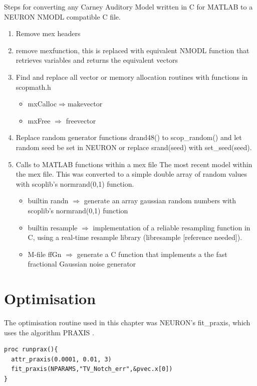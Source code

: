 Steps for converting any Carney Auditory Model written in C for MATLAB to a
NEURON NMODL compatible C file.
\begin{enumerate} 
\item Remove mex headers 
\item remove \textsf{mexfunction}, this is replaced with equivalent NMODL
  function that retrieves variables and returns the equivalent vectors
\item Find and replace all vector or memory allocation routines with functions
  in scopmath.h
\begin{itemize} 
\item \textsf{mxCalloc}$\Rightarrow$\textsf{makevector}
\item \textsf{mxFree} $\Rightarrow$ \textsf{freevector}
\end{itemize} 
\item Replace random generator functions \textsf{drand48()} to
  \mbox{\textsf{scop\_random()}} and let random seed be set in NEURON or replace
  \textsf{srand(seed)} with \mbox{\textsf{set\_seed(seed)}}.
\item Calls to MATLAB functions within a mex file The most recent model within
  the mex file.  This was converted to a simple double array of random values
  with scoplib's \mbox{\textsf{normrand(0,1)}} function.
\begin{itemize}
\item builtin \textsf{randn} $\Rightarrow$ generate an array gaussian random numbers with scoplib's
  \mbox{\textsf{normrand(0,1)}} function
\item builtin \textsf{resample} $\Rightarrow$ implementation of a reliable resampling function in C, using
  a real-time resample library (libresample [reference needed]).
\item M-file \textsf{ffGn} $\Rightarrow$ generate a C function that implements a the fast fractional Gaussian noise generator
\end{itemize}

\end{enumerate}


\section{Optimisation}

The optimisation  routine used in this chapter was NEURON's \textsf{fit\_praxis}, which uses the algorithm PRAXIS \citep{Brent:1976}.

 \begin{lstlisting}[label=lbl:runprax,caption=Set optimisation attributes and run fitting procedure.]
proc runprax(){
  attr_praxis(0.0001, 0.01, 3)
  fit_praxis(NPARAMS,"TV_Notch_err",&pvec.x[0])
}
\end{lstlisting}

